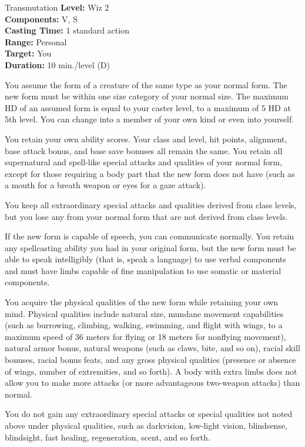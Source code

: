 {Transmutation}
{
	\textbf{Level:}
	Wiz 2\\
	\textbf{Components:}
	V, S\\
	\textbf{Casting Time:}
	1 standard action\\
	\textbf{Range:}
	Personal\\
	\textbf{Target:}
	You\\
	\textbf{Duration:}
	10 min./level (D)\\
}
{
	You assume the form of a creature of the same type as your normal form. The new form must be within one size category of your normal size. The maximum HD of an assumed form is equal to your caster level, to a maximum of 5 HD at 5th level. You can change into a member of your own kind or even into yourself.

	You retain your own ability scores. Your class and level, hit points, alignment, base attack bonus, and base save bonuses all remain the same. You retain all supernatural and spell-like special attacks and qualities of your normal form, except for those requiring a body part that the new form does not have (such as a mouth for a breath weapon or eyes for a gaze attack).

	You keep all extraordinary special attacks and qualities derived from class levels, but you lose any from your normal form that are not derived from class levels.

	If the new form is capable of speech, you can communicate normally. You retain any spellcasting ability you had in your original form, but the new form must be able to speak intelligibly (that is, speak a language) to use verbal components and must have limbs capable of fine manipulation to use somatic or material components.

	You acquire the physical qualities of the new form while retaining your own mind. Physical qualities include natural size, mundane movement capabilities (such as burrowing, climbing, walking, swimming, and flight with wings, to a maximum speed of 36 meters for flying or 18 meters for nonflying movement), natural armor bonus, natural weapons (such as claws, bite, and so on), racial skill bonuses, racial bonus feats, and any gross physical qualities (presence or absence of wings, number of extremities, and so forth). A body with extra limbs does not allow you to make more attacks (or more advantageous two-weapon attacks) than normal.

	You do not gain any extraordinary special attacks or special qualities not noted above under physical qualities, such as darkvision, low-light vision, blindsense, blindsight, fast healing, regeneration, scent, and so forth.

}
